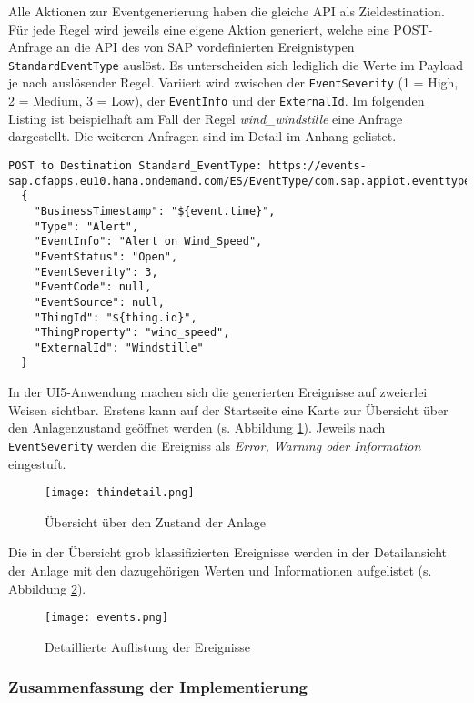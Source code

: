 Alle Aktionen zur Eventgenerierung haben die gleiche API als Zieldestination. Für jede Regel wird jeweils eine eigene Aktion generiert, welche eine POST-Anfrage an die API des von SAP vordefinierten Ereignistypen \texttt{StandardEventType} auslöst. Es unterscheiden sich lediglich die Werte im Payload je nach auslösender Regel. Variiert wird zwischen der \texttt{EventSeverity} (1 = High, 2 = Medium, 3 = Low), der \texttt{EventInfo} und der \texttt{ExternalId}. Im folgenden Listing ist beispielhaft am Fall der Regel \textit{wind\_windstille} eine Anfrage dargestellt. Die weiteren Anfragen sind im Detail im Anhang gelistet.
\newline
\begin{lstlisting}[caption= Beispielanfrage für die Generierung eines Ereignisses, label=eventex]
  POST to Destination Standard_EventType: https://events-sap.cfapps.eu10.hana.ondemand.com/ES/EventType/com.sap.appiot.eventtypes:StandardEventType/v1/Events
  {
    "BusinessTimestamp": "${event.time}",
    "Type": "Alert",
    "EventInfo": "Alert on Wind_Speed",
    "EventStatus": "Open",
    "EventSeverity": 3,
    "EventCode": null,
    "EventSource": null,
    "ThingId": "${thing.id}",
    "ThingProperty": "wind_speed",
    "ExternalId": "Windstille"
  }
\end{lstlisting}

\noindent In der UI5-Anwendung machen sich die generierten Ereignisse auf zweierlei Weisen sichtbar. Erstens kann auf der Startseite eine Karte zur Übersicht über den Anlagenzustand geöffnet werden (s. Abbildung \ref{detailoverview}). Jeweils nach \texttt{EventSeverity} werden die Ereigniss als \textit{Error, Warning oder Information} eingestuft. 

\begin{figure}[H]
  \centering
  \texttt{[image: thindetail.png]}
  \caption{Übersicht über den Zustand der Anlage}
  \label{detailoverview}
\end{figure}
\vspace{2mm}
\noindent Die in der Übersicht grob klassifizierten Ereignisse werden in der Detailansicht der Anlage mit den dazugehörigen Werten und Informationen aufgelistet (s. Abbildung \ref{thingdetail}).
\begin{figure}[H]
  \centering
  \texttt{[image: events.png]}
  \caption{Detaillierte Auflistung der Ereignisse}
  \label{thingdetail}
\end{figure}


\subsubsection{Zusammenfassung der Implementierung}

